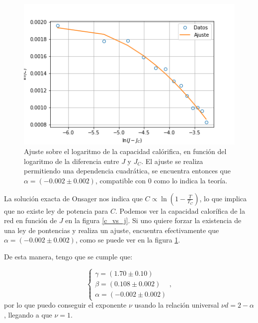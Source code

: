 \documentclass[
 reprint,
 amsmath,amssymb,
 aps,
]{revtex4-1}
\begin{document}
\begin{figure}
  \includegraphics[width=1.0\columnwidth]{images/ajuste_alpha.png}
  \caption{Ajuste sobre el logaritmo de la capacidad cal\'orifica, en funci\'on
    del logaritmo de la diferencia entre $J$ y $J_C$. El ajuste se realiza
    permitiendo una dependencia cuadr\'atica, se encuentra entonces que $\alpha
    = (-0.002 \pm 0.002)$, compatible con $0$ como lo indica la teor\'ia.}
  \label{ajuste_alpha}
\end{figure}

La soluci\'on exacta de Onsager nos indica que $C \propto \ln (1 -
\frac{T}{T_C})$, lo que implica que no existe ley de potencia para $C$. Podemos
ver la capacidad calor\'ifica de la red en funci\'on de $J$ en la figura
\ref{c_vs_j}. Si uno quiere forzar la existencia de una ley de pontencias y
realiza un ajuste, encuentra efectivamente que $\alpha = (-0.002 \pm 0.002)$,
como se puede ver en la figura \ref{ajuste_alpha}.

De esta manera, tengo que se cumple que:

$$
\left \{
  \begin{matrix}
    \gamma = (1.70 \pm 0.10) \\
    \beta = (0.108 \pm 0.002) \\
    \alpha = (-0.002 \pm 0.002)
  \end{matrix}
\right. ,
$$
por lo que puedo conseguir el exponente $\nu$ usando la relaci\'on universal $\nu d = 2 - \alpha$, llegando a que $\nu = 1$.

\end{document}
